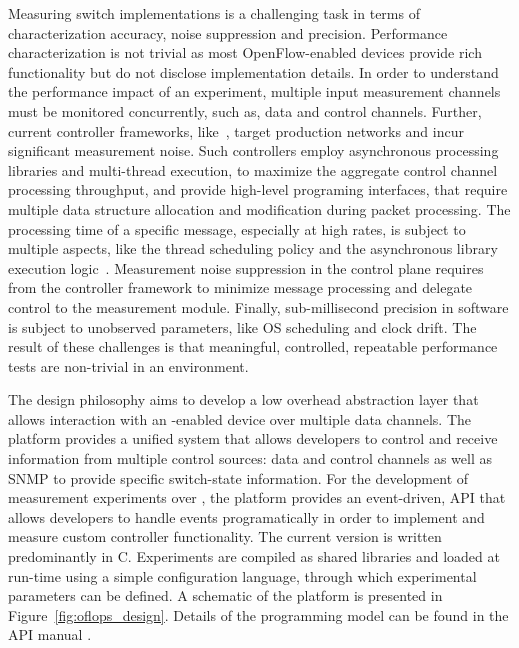 Measuring \of switch implementations is a challenging task in terms of
characterization accuracy, noise suppression and precision.  Performance
characterization is not trivial as most OpenFlow-enabled devices provide rich
functionality but do not disclose implementation details. In order to understand
the performance impact of an experiment, multiple input measurement channels
must be monitored concurrently, such as, data and control channels. Further,
current controller frameworks, like~\cite{Gude08,floodlight}, target production
networks and incur significant measurement noise. Such controllers employ
asynchronous processing libraries and multi-thread execution, to maximize the
aggregate control channel processing throughput, and provide high-level
programing interfaces, that require multiple data structure allocation and
modification during packet processing.  The processing time of a specific \of
message, especially at high rates, is subject to multiple aspects, like the
thread scheduling policy and the asynchronous library execution
logic~\cite{Jarschel2012}.  Measurement noise suppression in the control plane
requires from the controller framework to minimize message processing and
delegate control to the measurement module.  Finally, sub-millisecond precision
in software is subject to unobserved parameters, like OS scheduling and clock
drift. The result of these challenges is that meaningful, controlled, repeatable
performance tests are non-trivial in an \of environment.

The \oflops design philosophy aims to develop a low overhead abstraction layer
that allows interaction with an \of-enabled device over multiple data
channels.  The platform provides a unified system that allows developers to
control and receive information from multiple control sources: data and control
channels as well as SNMP to provide specific switch-state information.
For the development of measurement experiments over \oflops, the platform
provides an event-driven, API that allows developers to handle events
programatically in order to implement and measure custom controller
functionality. The current version is written predominantly in C. Experiments
are compiled as shared libraries and loaded at run-time using a simple
configuration language, through which experimental parameters can be defined.
A schematic of the platform is presented in Figure~\ref{fig:oflops_design}.
Details of the \oflops programming model can be found in the API manual
\cite{oflops-manual}.

